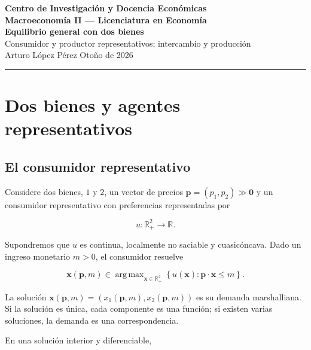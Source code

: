 \documentclass[12pt]{article}
\theoremstyle{cideplain}
\theoremstyle{cidedef}
\DeclareMathOperator*{\argmax}{arg\,max}
\newcommand{\R}{\mathbb{R}}
\newcommand{\p}{\bm p}
\newcommand{\x}{\bm x}
\begin{document}

\begin{center}
  {\large\bfseries Centro de Investigación y Docencia Económicas}\\[0.25em]
  {\large\bfseries Macroeconomía II --- Licenciatura en Economía}\\[0.8em]
  {\LARGE\bfseries\color{cideblue} Equilibrio general con dos bienes}\\[0.6em]
  {\large Consumidor y productor representativos; intercambio y producción}\\[0.8em]
  Arturo López Pérez \hfill Otoño de 2026
\end{center}

\vspace{0.5em}
\hrule
\vspace{1.0em}

\section{Dos bienes y agentes representativos}

\subsection{El consumidor representativo}

Considere dos bienes, \(1\) y \(2\), un vector de precios
\(\p=(p_1,p_2)\gg\bm 0\) y un consumidor representativo con preferencias
representadas por

\[
  u:\R_+^2\longrightarrow\R.
\]

Supondremos que \(u\) es continua, localmente no saciable y cuasicóncava. Dado un ingreso
monetario \(m>0\), el consumidor resuelve

\begin{equation}
  \x(\p,m)
  \in
  \argmax_{\x\in\R_+^2}
  \left\{u(\x):\p\cdot\x\leq m\right\}.
  \label{eq:rep-consumer}
\end{equation}

La solución \(\x(\p,m)=(x_1(\p,m),x_2(\p,m))\) es su demanda marshalliana.
Si la solución es única, cada componente es una función; si existen varias soluciones,
la demanda es una correspondencia.

En una solución interior y diferenciable,
\end{document}
